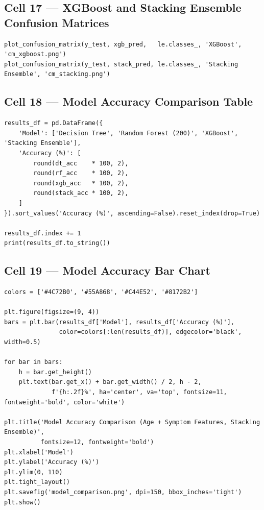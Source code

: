 \documentclass[12pt,a4paper]{article}
\begin{document}
\subsection{Cell 17 --- XGBoost and Stacking Ensemble Confusion Matrices}

\begin{lstlisting}[caption=Cell 17: XGBoost and Stacking Ensemble Confusion Matrices]
plot_confusion_matrix(y_test, xgb_pred,   le.classes_, 'XGBoost',           'cm_xgboost.png')
plot_confusion_matrix(y_test, stack_pred, le.classes_, 'Stacking Ensemble', 'cm_stacking.png')
\end{lstlisting}

\subsection{Cell 18 --- Model Accuracy Comparison Table}

\begin{lstlisting}[caption=Cell 18: Model Accuracy Comparison Table]
results_df = pd.DataFrame({
    'Model': ['Decision Tree', 'Random Forest (200)', 'XGBoost', 'Stacking Ensemble'],
    'Accuracy (%)': [
        round(dt_acc    * 100, 2),
        round(rf_acc    * 100, 2),
        round(xgb_acc   * 100, 2),
        round(stack_acc * 100, 2),
    ]
}).sort_values('Accuracy (%)', ascending=False).reset_index(drop=True)

results_df.index += 1
print(results_df.to_string())
\end{lstlisting}

\subsection{Cell 19 --- Model Accuracy Bar Chart}

\begin{lstlisting}[caption=Cell 19: Model Accuracy Comparison Bar Chart]
colors = ['#4C72B0', '#55A868', '#C44E52', '#8172B2']

plt.figure(figsize=(9, 4))
bars = plt.bar(results_df['Model'], results_df['Accuracy (%)'],
               color=colors[:len(results_df)], edgecolor='black', width=0.5)

for bar in bars:
    h = bar.get_height()
    plt.text(bar.get_x() + bar.get_width() / 2, h - 2,
             f'{h:.2f}%', ha='center', va='top', fontsize=11, fontweight='bold', color='white')

plt.title('Model Accuracy Comparison (Age + Symptom Features, Stacking Ensemble)',
          fontsize=12, fontweight='bold')
plt.xlabel('Model')
plt.ylabel('Accuracy (%)')
plt.ylim(0, 110)
plt.tight_layout()
plt.savefig('model_comparison.png', dpi=150, bbox_inches='tight')
plt.show()
\end{lstlisting}
\end{document}
